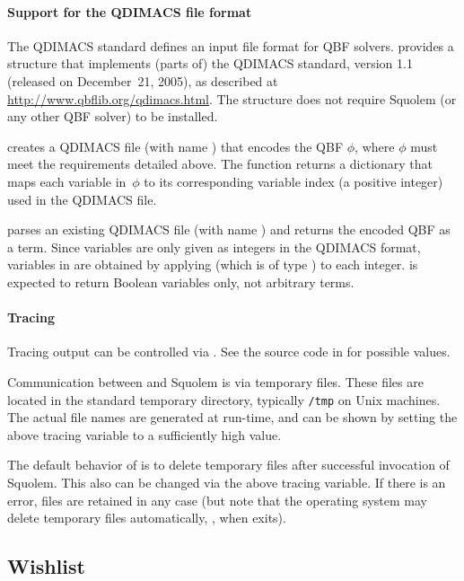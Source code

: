 \paragraph{Support for the QDIMACS file format}

The QDIMACS standard defines an input file format for QBF solvers.
 provides a structure  that implements
(parts of) the QDIMACS standard, version 1.1 (released on December~21,
2005), as described at \url{http://www.qbflib.org/qdimacs.html}.  The
 structure does not require Squolem (or any other QBF
solver) to be installed.

 creates a QDIMACS file
(with name ) that encodes the QBF $\phi$, where $\phi$ must
meet the requirements detailed above.  The function returns a
dictionary that maps each variable in~$\phi$ to its corresponding
variable index (a positive integer) used in the QDIMACS file.

 parses an existing QDIMACS
file (with name ) and returns the encoded QBF as a \HOL{}
term.  Since variables are only given as integers in the QDIMACS
format, variables in \HOL{} are obtained by applying  (which is
of type ) to each integer.   is expected to
return Boolean variables only, not arbitrary \HOL{} terms.

\paragraph{Tracing}

Tracing output can be controlled via .  See the source code in  for possible
values.

Communication between \HOL{} and Squolem is via temporary files.
These files are located in the standard temporary directory, typically
{\tt /tmp} on Unix machines.  The actual file names are generated at
run-time, and can be shown by setting the above tracing variable to a
sufficiently high value.

The default behavior of  is to delete temporary files
after successful invocation of Squolem.  This also can be changed via
the above tracing variable.  If there is an error, files are retained
in any case (but note that the operating system may delete temporary
files automatically, \eg, when \HOL{} exits).

\subsection{Wishlist}

